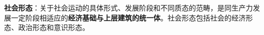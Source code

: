 \textbf{{}}

\textbf{{社会形态}}{：关于社会运动的具体形式、发展阶段和不同质态的范畴，}{是同生产力发展一定阶段相适应的}\textbf{{经济基础与上层建筑的统一体}}{。社会形态包括社会的}{经济形态、政治形态和意识形态}{。}
